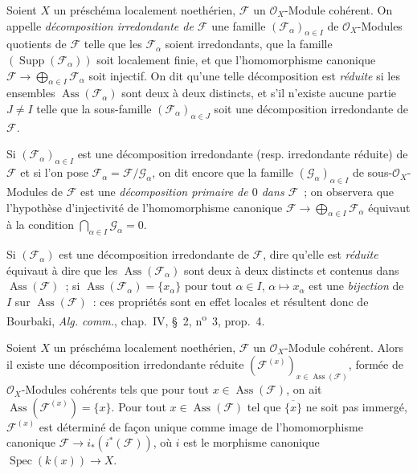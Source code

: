 \begin{definition}[3.2.5]
\label{IV.2.3.2.5-fr}
Soient $X$ un préschéma localement noethérien, $\mathcal F$ un
$\mathcal O_X$-Module cohérent. On appelle \emph{décomposition irredondante de
$\mathcal F$} une famille $(\mathcal F_\alpha)_{\alpha\in I}$ de
$\mathcal O_X$-Modules quotients de $\mathcal F$ telle que les
$\mathcal F_\alpha$ soient irredondants, que la famille
$(\operatorname{Supp}(\mathcal F_\alpha))$ soit localement finie, et que
l'homomorphisme canonique
$\mathcal F\to\bigoplus_{\alpha\in I}\mathcal F_\alpha$ soit injectif. On dit
qu'une telle décomposition est \emph{réduite} si les ensembles
$\operatorname{Ass}(\mathcal F_\alpha)$ sont deux à deux distincts, et s'il
n'existe aucune partie $J\ne I$ telle que la sous-famille
$(\mathcal F_\alpha)_{\alpha\in J}$ soit une décomposition irredondante de
$\mathcal F$.
\end{definition}

Si $(\mathcal F_\alpha)_{\alpha\in I}$ est une décomposition irredondante
(resp. irredondante réduite) de $\mathcal F$ et si l'on pose
$\mathcal F_\alpha=\mathcal F/\mathcal G_\alpha$, on dit encore que la
famille $(\mathcal G_\alpha)_{\alpha\in I}$ de sous-$\mathcal O_X$-Modules de
$\mathcal F$ est une \emph{décomposition primaire de $0$ dans $\mathcal F$}~;
on observera que l'hypothèse d'injectivité de l'homomorphisme canonique
$\mathcal F\to\bigoplus_{\alpha\in I}\mathcal F_\alpha$ équivaut à la
condition $\bigcap_{\alpha\in I}\mathcal G_\alpha=0$.

Si $(\mathcal F_\alpha)$ est une décomposition irredondante de $\mathcal F$,
dire qu'elle est \emph{réduite} équivaut à dire que les
$\operatorname{Ass}(\mathcal F_\alpha)$ sont deux à deux distincts et contenus
dans $\operatorname{Ass}(\mathcal F)$~; si
$\operatorname{Ass}(\mathcal F_\alpha)=\{x_\alpha\}$ pour tout $\alpha\in I$,
$\alpha\mapsto x_\alpha$ est une \emph{bijection} de $I$ sur
$\operatorname{Ass}(\mathcal F)$~: ces propriétés sont en effet locales et
résultent donc de Bourbaki, \emph{Alg. comm.}, chap.~IV, \S~2,
n\textsuperscript{o}~3, prop.~4.

\begin{proposition}[3.2.6]
\label{IV.2.3.2.6-fr}
Soient $X$ un préschéma localement noethérien, $\mathcal F$ un
$\mathcal O_X$-Module cohérent. Alors il existe une décomposition irredondante
réduite $(\mathcal F^{(x)})_{x\in\operatorname{Ass}(\mathcal F)}$, formée de
$\mathcal O_X$-Modules cohérents tels que pour tout
$x\in\operatorname{Ass}(\mathcal F)$, on ait
$\operatorname{Ass}(\mathcal F^{(x)})=\{x\}$. Pour tout
$x\in\operatorname{Ass}(\mathcal F)$ tel que $\overline{\{x\}}$ ne soit pas
immergé, $\mathcal F^{(x)}$ est déterminé de façon unique comme image de
l'homomorphisme canonique $\mathcal F\to i_*(i^*(\mathcal F))$, où $i$ est le
morphisme canonique $\operatorname{Spec}(k(x))\to X$.
\end{proposition}

